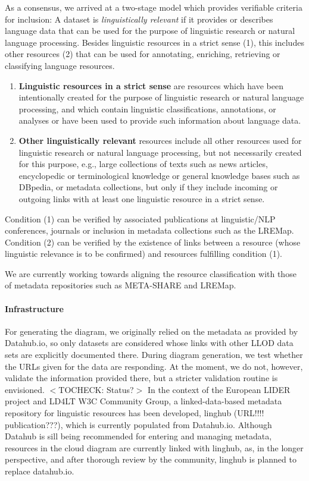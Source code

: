 As a consensus, we arrived at a two-stage model which provides verifiable criteria for inclusion: 
A dataset is \emph{linguistically relevant} if it provides or  describes language data that can be used for the purpose of linguistic research or natural language processing. Besides linguistic resources in  a strict sense (1), this includes other resources (2) that can be used for  annotating, enriching, retrieving or classifying language resources.
\begin{enumerate}[(1)]
\item \textbf{Linguistic resources in a strict sense} are resources which  have been intentionally created for the purpose of linguistic research or natural language processing, and which contain linguistic classifications, annotations, or analyses or have been used to provide such information about language data.
\item \textbf{Other linguistically relevant} resources include all other  resources used for linguistic research or natural language processing,  but not necessarily created for this purpose, e.g., large collections of  texts such as news articles, encyclopedic or terminological knowledge  or general knowledge bases such as DBpedia, or metadata collections, but only if they include incoming or outgoing links with at least one linguistic resource in a strict sense. 
\end{enumerate}

Condition (1) can be verified by associated publications at linguistic/NLP conferences, journals or inclusion in metadata collections such as the LREMap. 
Condition (2) can be verified by the existence of links between a resource (whose linguistic relevance is to be confirmed) and resources fulfilling condition (1).

We are currently working towards aligning the resource classification with those of metadata repositories such as META-SHARE and LREMap.

\paragraph{Infrastructure}
For generating the diagram, we originally relied on the metadata as provided by Datahub.io, so only datasets are considered whose links with other LLOD data sets are explicitly documented there.
During diagram generation, we test whether the URLs given for the data are responding. At the moment, we do not, however, validate the information provided there, but a stricter validation routine is envisioned. $<$TOCHECK: Status?$>$
In the context of the European LIDER project and LD4LT W3C Community Group, a linked-data-based metadata repository for linguistic resources has been developed, linghub (URL!!!! publication???), which is currently populated from Datahub.io. Although Datahub is sill being recommended for entering and managing metadata, 
resources in the cloud diagram are currently linked with linghub, as, in the longer perspective, and after thorough review by the community, linghub is planned to replace datahub.io.

